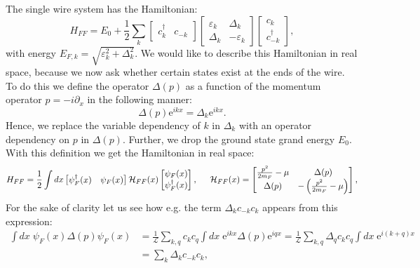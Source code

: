 The single wire system has the Hamiltonian:
\begin{equation}
H_{FF} = E_0 + \frac{1}{2}\sum_{k} \begin{bmatrix} c^\dagger_k & c_{-k} \end{bmatrix} \begin{bmatrix} \varepsilon_k & \Delta_k \\ \Delta_k & -\varepsilon_k \end{bmatrix} \begin{bmatrix} c_k \\ c^\dagger_{-k} \end{bmatrix},
\end{equation}
with energy $E_{F,k} = \sqrt{ \varepsilon^2_k + \Delta^2_k}$. We would like to describe this Hamiltonian in real space, because we now ask whether certain states exist at the ends of the wire. To do this we define the operator $\Delta(p)$ as a function of the momentum operator $p = -i\partial_x$ in the following manner:
\begin{equation}
\Delta(p)\text{e}^{ikx} = \Delta_k\text{e}^{ikx}.
\label{eq.Deltapdef}
\end{equation}
Hence, we replace the variable dependency of $k$ in $\Delta_k$ with an operator dependency on $p$ in $\Delta(p)$. Further, we drop the ground state grand energy $E_0$. With this definition we get the Hamiltonian in real space:
\begin{equation}
H_{FF} = \frac{1}{2}\int dx \begin{bmatrix} \psi^\dagger_{F}(x) & \psi_{F}(x) \end{bmatrix} \mathcal{H}_{FF}(x) \begin{bmatrix} \psi_{F}(x) \\ \psi^\dagger_{F}(x) \end{bmatrix}, \hspace{0.5cm} \mathcal{H}_{FF}(x) = \begin{bmatrix} \frac{p^2}{2m_F} - \mu  & \Delta(p) \\ \Delta(p) & -\left( \frac{p^2}{2m_F} - \mu \right) \end{bmatrix},
\label{eq.MFHamiltonianrealspace}
\end{equation}
For the sake of clarity let us see how e.g. the term $\Delta_kc_{-k}c_{k}$ appears from this expression:
\begin{align}
\int dx \; \psi_{F}(x) \Delta(p) \psi_{F}(x) &= \frac{1}{\mathcal{L}}\sum_{k,q}c_k c_q\int dx \; \text{e}^{ikx}\Delta(p)\text{e}^{iqx} = \frac{1}{\mathcal{L}}\sum_{k,q}\Delta_qc_kc_q\int dx \; \text{e}^{i(k + q)x} \nonumber \\
&= \sum_{k}\Delta_kc_{-k}c_k, \nonumber 
\end{align}

